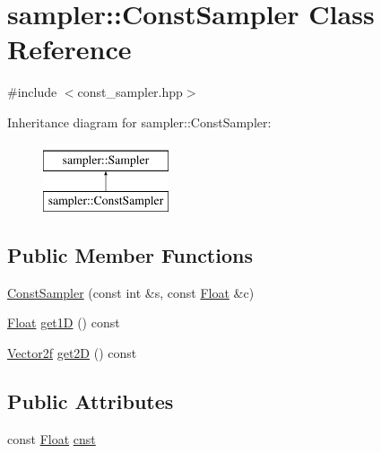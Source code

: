 \hypertarget{classsampler_1_1ConstSampler}{}\section{sampler\+::Const\+Sampler Class Reference}
\label{classsampler_1_1ConstSampler}


{\ttfamily \#include $<$const\+\_\+sampler.\+hpp$>$}

Inheritance diagram for sampler\+::Const\+Sampler\+:\begin{figure}[H]
\begin{center}
\leavevmode
\includegraphics[height=2.000000cm]{classsampler_1_1ConstSampler}
\end{center}
\end{figure}
\subsection*{Public Member Functions}
\begin{DoxyCompactItemize}
\item 
\mbox{\hyperlink{classsampler_1_1ConstSampler_af9859fdd671ce5f3be77eda3d147f667}{Const\+Sampler}} (const int \&s, const \mbox{\hyperlink{cyclop_8hpp_a07afd7094cb489cbd514c76e6f55d34f}{Float}} \&c)
\item 
\mbox{\hyperlink{cyclop_8hpp_a07afd7094cb489cbd514c76e6f55d34f}{Float}} \mbox{\hyperlink{classsampler_1_1ConstSampler_a5c8a7744e2b2f4170663cb9b9207179d}{get1D}} () const
\item 
\mbox{\hyperlink{cyclop_8hpp_a0c5eff6545fe0b71d0592c88d930b697}{Vector2f}} \mbox{\hyperlink{classsampler_1_1ConstSampler_a21897522074763d7a61cbe374ae30dce}{get2D}} () const
\end{DoxyCompactItemize}
\subsection*{Public Attributes}
\begin{DoxyCompactItemize}
\item 
const \mbox{\hyperlink{cyclop_8hpp_a07afd7094cb489cbd514c76e6f55d34f}{Float}} \mbox{\hyperlink{classsampler_1_1ConstSampler_a912148430feee4b02cd91c5565323a3c}{cnst}}
\end{DoxyCompactItemize}


